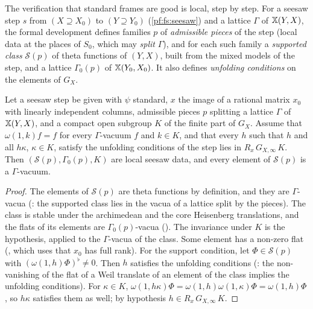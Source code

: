 The verification that standard frames are good is local, step by step. For a seesaw step $s$ from $(X\supseteq X_0)$ to $(Y\supseteq Y_0)$
(\cref{pf:fs:seesaw}) and a lattice $\Gamma$ of $\mathbb X(Y,X)$, the formal development defines families $p$ of \emph{admissible pieces} of the step
(local data at the places of $S_0$, which may \emph{split} $\Gamma$), and for each such family a \emph{supported class} $\mathcal S(p)$ of theta
functions of $(Y,X)$, built from the mixed models of the step, and a lattice $\Gamma_0(p)$ of $\mathbb X(Y_0,X_0)$. It also defines
\emph{unfolding conditions} on the elements of $G_X$.
\begin{lemma}\label{pf:fs:locCls}
Let a seesaw step be given with $\psi$ standard, $x$ the image of a rational matrix $x_0$ with linearly independent columns, admissible
pieces $p$ splitting a lattice $\Gamma$ of $\mathbb X(Y,X)$, and a compact open subgroup $K$ of the finite part of $G_X$. Assume that
$\omega(1,k)f=f$ for every $\Gamma$-vacuum $f$ and $k\in K$, and that every $h$ such that $h$ and all $h\kappa$, $\kappa\in K$, satisfy the
unfolding conditions of the step lies in $R_x\,G_{X,\infty}\,K$. Then $(\mathcal S(p),\Gamma_0(p),K)$ are local seesaw data, and every element
of $\mathcal S(p)$ is a $\Gamma$-vacuum.
\end{lemma}

\begin{proof}
The elements of $\mathcal S(p)$ are theta functions by definition, and they are $\Gamma$-vacua
(: the supported class lies in the vacua of a lattice split
by the pieces). The class is stable under the archimedean and the core Heisenberg translations, and the flats of its elements are
$\Gamma_0(p)$-vacua (). The invariance under $K$ is the hypothesis, applied to
the $\Gamma$-vacua of the class. Some element has a non-zero flat
(, which uses that $x_0$ has full rank). For the support condition, let
$\Phi\in\mathcal S(p)$ with $(\omega(1,h)\Phi)^\flat\ne0$. Then $h$ satisfies the unfolding conditions
(: the non-vanishing of the flat of a Weil translate of an element
of the class implies the unfolding conditions). For $\kappa\in K$, $\omega(1,h\kappa)\Phi=\omega(1,h)\omega(1,\kappa)\Phi=\omega(1,h)\Phi$, so
$h\kappa$ satisfies them as well; by hypothesis $h\in R_x\,G_{X,\infty}\,K$.
\end{proof}

